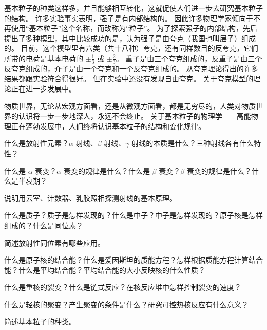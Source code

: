 基本粒子的种类这样多，并且能够相互转化，这就促使人们进一步去研究基本粒子的结构。
许多实验事实表明，强子是有内部结构的。
因此许多物理学家倾向于不再使用“基本粒子”这个名称，而改称为“粒子”。
为了探索强子的内部结构，先后提出了多种模型，其中比较成功的是，认为强子是由夸克（我国也叫层子）组成的。
目前，这个模型里有六类（共十八种）夸克，还有同样数目的反夸克，它们所带的电荷是基本电荷的 $\pm \frac{1}{3}$ 或 $\pm\frac{2}{3}$。
重子是由三个夸克组成的，反重子是由三个反夸克组成的，介子是由一个夸克和一个反夸克组成的。
从夸克理论得出的许多结果都跟实验符合得很好。
但在实验中还没有发现自由夸克。
关于夸克模型的理论正在进一步发展中。

物质世界，无论从宏观方面看，还是从微观方面看，都是无穷尽的，人类对物质世界的认识将一步一步地深人，永远不会终止。
关于基本粒子的物理学——高能物理正在蓬勃发展中，人们终将认识基本粒子的结构和变化规律。

\begin{Review}
\begin{question}
  \item 什么是放射性元素？$\alpha$ 射线、$\beta$ 射线、$\gamma$ 射线的本质是什么？三种射线各有什么特性？
  \item 什么是 $\alpha$ 衰变？$\alpha$ 衰变的规律是什么？什么是 $\beta$ 衰变？$\beta$ 衰变的规律是什么？什么是半衰期？
  \item 说明用云室、计数器、乳胶照相探测射线的基本原理。
  \item 什么是质子？质子是怎样发现的？什么是中子？中子是怎样发现的？原子核是怎样组成的？什么是同位素？
  \item 简述放射性同位素有哪些应用。
  \item 什么是原子核的结合能？什么是爱因斯坦的质能方程？怎样根据质能方程计算结合能？什么是平均结合能？平均结合能的大小反映核的什么性质？
  \item 什么是重核的裂变？什么是链式反应？在核反应堆中怎样控制裂变的速度？
  \item 什么是轻核的聚变？产生聚变的条件是什么？研究可控热核反应有什么意义？
  \item 简述基本粒子的种类。
\end{question}
\end{Review}

